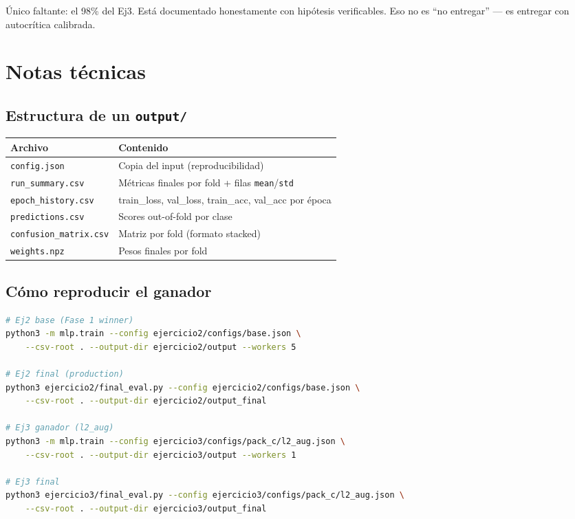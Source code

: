 \documentclass[11pt,a4paper]{article}
\newcommand{\file}[1]{\texttt{\small #1}}
\begin{document}
\begin{takeaway}
Único faltante: el 98\% del Ej3. Está documentado honestamente con hipótesis verificables. Eso no es ``no entregar'' — es entregar con autocrítica calibrada.
\end{takeaway}

\appendix
\section{Notas técnicas}

\subsection{Estructura de un \texttt{output/}}
\begin{center}
\small
\begin{tabular}{@{}ll@{}}
\toprule
\textbf{Archivo} & \textbf{Contenido} \\
\midrule
\file{config.json}          & Copia del input (reproducibilidad) \\
\file{run\_summary.csv}     & Métricas finales por fold + filas \texttt{mean}/\texttt{std} \\
\file{epoch\_history.csv}   & train\_loss, val\_loss, train\_acc, val\_acc por época \\
\file{predictions.csv}      & Scores out-of-fold por clase \\
\file{confusion\_matrix.csv}& Matriz por fold (formato stacked) \\
\file{weights.npz}          & Pesos finales por fold \\
\bottomrule
\end{tabular}
\end{center}

\subsection{Cómo reproducir el ganador}
\begin{lstlisting}[language=bash]
# Ej2 base (Fase 1 winner)
python3 -m mlp.train --config ejercicio2/configs/base.json \
    --csv-root . --output-dir ejercicio2/output --workers 5

# Ej2 final (production)
python3 ejercicio2/final_eval.py --config ejercicio2/configs/base.json \
    --csv-root . --output-dir ejercicio2/output_final

# Ej3 ganador (l2_aug)
python3 -m mlp.train --config ejercicio3/configs/pack_c/l2_aug.json \
    --csv-root . --output-dir ejercicio3/output --workers 1

# Ej3 final
python3 ejercicio3/final_eval.py --config ejercicio3/configs/pack_c/l2_aug.json \
    --csv-root . --output-dir ejercicio3/output_final
\end{lstlisting}
\end{document}
